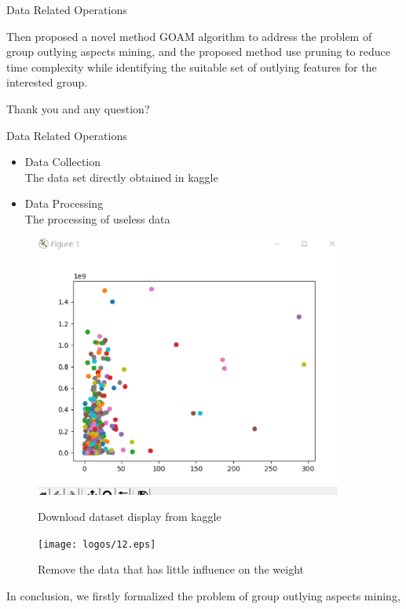 \documentclass[
 size=14pt,
 paper=smartboard,  %
 mode=present, 		%
 display=slides, 	%
 style=tuliplab,  	%
 pauseslide,
 fleqn,leqno]{powerdot}
\begin{document}
\begin{slide}[toc=,bm=]{ Data Related Operations}
\begin{note}
Then proposed a novel method GOAM algorithm to address the problem of
group outlying aspects mining,
and the proposed method use pruning to reduce time complexity
while identifying the suitable set of outlying features for the interested group.

Thank you and any question?
\end{note}

\end{slide}


\begin{slide}[toc=,bm=]{ Data Related Operations}
  \begin{itemize}
  \item Data Collection
  \\The data set directly obtained in kaggle    
  \item 
  Data Processing
  \\The processing of useless data
  
  \end{itemize}
  \begin{figure}[htbp]
    \centering
    \begin{minipage}[t]{0.48\textwidth}
      \centering
      \includegraphics[width=0.9\textwidth]{logos/11.eps}
      \vspace{-1.4em}
      \caption{Download dataset display from kaggle}
    \end{minipage}
    \begin{minipage}[t]{0.48\textwidth}
      \centering
      \texttt{[image: logos/12.eps]}
      \vspace{-1.4em}
      \caption{Remove the data that has little influence on the weight}
    \end{minipage}
  \end{figure}
  \begin{note}
  In conclusion,
  we firstly formalized the problem of
  group outlying aspects mining,
  

\end{note}
\end{slide}
\end{document}
